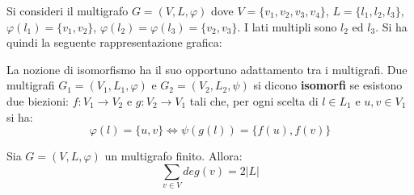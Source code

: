 \begin{example}
	Si consideri il multigrafo $G=(V,L,\varphi)$ dove $V = \{v_{1},v_{2},v_{3},v_{4}\}$, $L=\{l_{1},l_{2},l_{3}\}$, $\varphi(l_{1})=\{v_{1},v_{2}\}$, $\varphi(l_{2})=\varphi(l_{3}) = \{v_{2},v_{3}\}$. I lati multipli sono $l_{2}$ ed $l_{3}$. Si ha quindi la seguente rappresentazione grafica:
	\begin{center}
	\end{center}
\end{example}


\begin{osservation}
	    La nozione di isomorfismo ha il suo opportuno adattamento tra i multigrafi. Due multigrafi $G_{1}=(V_{1},L_{1},\varphi)$ e $G_{2}=(V_{2},L_{2},\psi)$ si dicono \textbf{isomorfi} se esistono due biezioni: $f: V_{1} \rightarrow V_{2}$ e $g: V_{2} \rightarrow V_{1}$ tali che, per ogni scelta di $l \in L_{1}$ e $u,v \in V_{1}$ si ha:
    \begin{displaymath}
        \varphi(l) = \{u,v\} \iff \psi(g(l))= \{f(u),f(v)\}
    \end{displaymath}
\end{osservation}


\begin{teorbox}
	    Sia $G=(V,L,\varphi)$ un multigrafo finito. Allora:
    \begin{displaymath}
        \sum_{v \in V} deg(v) = 2 |L|
    \end{displaymath}
\end{teorbox}

